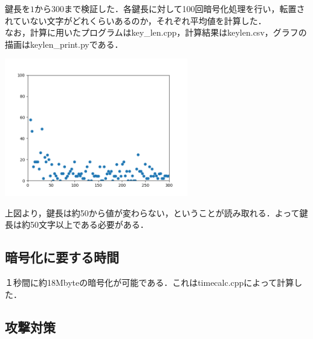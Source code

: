 \documentclass[a4p]{jarticle}
\begin{document}
鍵長を$1$から$300$まで検証した．各鍵長に対して100回暗号化処理を行い，転置されていない文字がどれくらいあるのか，それぞれ平均値を計算した．\\
なお，計算に用いたプログラムはkey\_len.cpp，計算結果はkeylen.csv，グラフの描画はkeylen\_print.pyである．\\
\begin{center}
  \includegraphics[width=8cm]{./tex_pic/figure.png}\\
\end{center}
上図より，鍵長は約50から値が変わらない，ということが読み取れる．よって鍵長は約50文字以上である必要がある．

\subsection{暗号化に要する時間}
１秒間に約18Mbyteの暗号化が可能である．これはtimecalc.cppによって計算した．

\subsection{攻撃対策}
\end{document}
